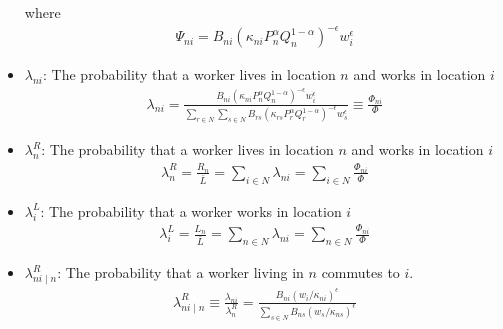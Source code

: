 \begin{itemize}
        where 
        \begin{align}
            \Psi_{n i}=B_{n i}\left(\kappa_{n i} P_n^\alpha Q_n^{1-\alpha}\right)^{-\epsilon} w_i^\epsilon
        \end{align}
    \item $\lambda_{ni}$: The probability that a worker lives in location $n$ and works in location $i$
        \begin{align}
            \lambda_{n i}=\frac{B_{n i}\left(\kappa_{n i} P_n^\alpha Q_n^{1-\alpha}\right)^{-\epsilon} w_i^\epsilon}{\sum_{r \in N} \sum_{s \in N} B_{r s}\left(\kappa_{r s} P_r^\alpha Q_r^{1-\alpha}\right)^{-\epsilon} w_s^\epsilon} \equiv \frac{\Phi_{n i}}{\Phi}
        \end{align}
    \item $\lambda_n^R$: The probability that a worker lives in location $n$ and works in location $i$
        \begin{align}
            \lambda_n^R=\frac{R_n}{\bar{L}}=\sum_{i \in N} \lambda_{n i}=\sum_{i \in N} \frac{\Phi_{n i}}{\Phi}
        \end{align}
    \item $\lambda_i^L$: The probability that a worker works in location $i$
        \begin{align}
            \lambda_i^L=\frac{L_n}{\bar{L}}=\sum_{n \in N} \lambda_{n i}=\sum_{n \in N} \frac{\Phi_{n i}}{\Phi}
        \end{align}
    \item $\lambda_{ni\mid n}^R$: The probability that a worker living in $n$ commutes to $i$.
        \begin{align}
            \lambda_{n i \mid n}^R \equiv \frac{\lambda_{n i}}{\lambda_n^R}=\frac{B_{n i}\left(w_i / \kappa_{n i}\right)^\epsilon}{\sum_{s \in N} B_{n s}\left(w_s / \kappa_{n s}\right)^\epsilon}
        \end{align}
\end{itemize}
